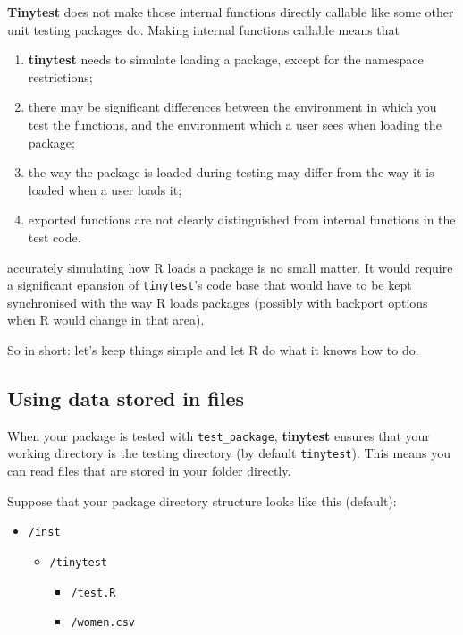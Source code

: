 \documentclass[11pt]{article}
\newcommand{\code}[1]{\texttt{#1}}
\newcommand{\pkg}[1]{\textbf{#1}}
\begin{document}
\pkg{Tinytest} does not make those internal functions directly callable like some 
other unit testing packages do. Making internal functions callable means that 
\begin{enumerate}
\item \pkg{tinytest} needs to simulate loading a package, except for the namespace
restrictions;
\item there may be significant differences between the environment in which you
test the functions, and the environment which a user sees when loading the
package;
\item the way the package is loaded during testing may differ from the way it is loaded
      when a user loads it;
\item exported functions are not clearly distinguished from internal functions in
the test code.
\end{enumerate}
accurately simulating how R loads a package is no small matter. It would
require a significant epansion of \code{tinytest}'s code base that would have
to be kept synchronised with the way R loads packages (possibly with backport
options when R would change in that area).

So in short: let's keep things simple and let R do what it knows how to do.




\subsection{Using data stored in files}
\label{sect:comparefiles}
When your package is tested with \code{test\_package}, \pkg{tinytest} ensures
that your working directory is the testing directory (by default
\code{tinytest}).  This means you can read files that are stored in your folder
directly.

Suppose that your package directory structure looks like this (default):
\begin{itemize}
\item[]\code{/inst}
  \begin{itemize}
    \item[]\code{/tinytest}
    \begin{itemize}
       \item[]\code{/test.R}
       \item[]\code{/women.csv}
    \end{itemize}
  \end{itemize}
\end{itemize}
\end{document}
